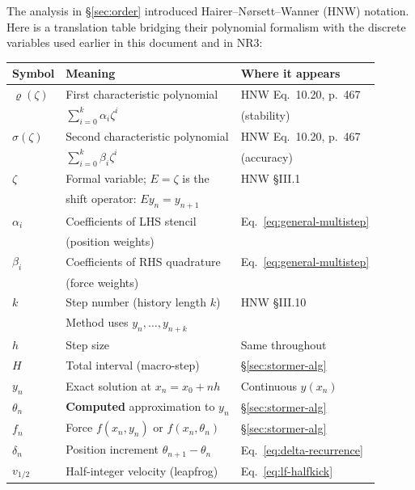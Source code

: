 \documentclass[11pt]{article}
\begin{document}
The analysis in \S\ref{sec:order} introduced Hairer--N{\o}rsett--Wanner
(HNW) notation.  Here is a translation table bridging their polynomial
formalism with the discrete variables used earlier in this document and in
NR3:

\begin{center}
\begin{tabular}{@{}lll@{}}
\toprule
\textbf{Symbol} & \textbf{Meaning} & \textbf{Where it appears} \\
\midrule
$\varrho(\zeta)$ & First characteristic polynomial & HNW Eq.~10.20, p.~467 \\
                & $\sum_{i=0}^k \alpha_i \zeta^i$ & (stability) \\
$\sigma(\zeta)$ & Second characteristic polynomial & HNW Eq.~10.20, p.~467 \\
                & $\sum_{i=0}^k \beta_i \zeta^i$ & (accuracy) \\
$\zeta$         & Formal variable; $E = \zeta$ is the & HNW \S III.1 \\
                & shift operator: $E y_n = y_{n+1}$ & \\
$\alpha_i$      & Coefficients of LHS stencil & Eq.~\eqref{eq:general-multistep} \\
                & (position weights) & \\
$\beta_i$       & Coefficients of RHS quadrature & Eq.~\eqref{eq:general-multistep} \\
                & (force weights) & \\
$k$             & Step number (history length $k$) & HNW \S III.10 \\
                & Method uses $y_{n},\dots,y_{n+k}$ & \\
$h$             & Step size & Same throughout \\
$H$             & Total interval (macro-step) & \S\ref{sec:stormer-alg} \\
$y_n$           & Exact solution at $x_n = x_0 + nh$ & Continuous $y(x_n)$ \\
$\theta_n$      & \textbf{Computed} approximation to $y_n$ & \S\ref{sec:stormer-alg} \\
$f_n$           & Force $f(x_n, y_n)$ or $f(x_n, \theta_n)$ & \S\ref{sec:stormer-alg} \\
$\delta_n$      & Position increment $\theta_{n+1}-\theta_n$ & Eq.~\eqref{eq:delta-recurrence} \\
$v_{1/2}$       & Half-integer velocity (leapfrog) & Eq.~\eqref{eq:lf-halfkick} \\
\bottomrule
\end{tabular}
\end{center}
\end{document}
